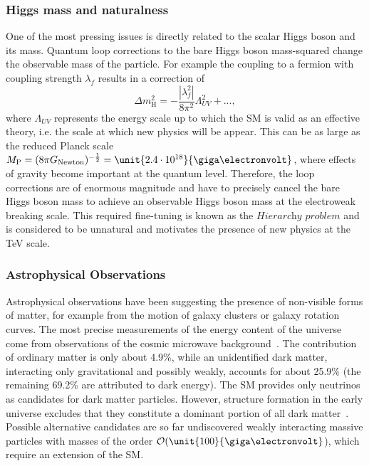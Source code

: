 \subsubsection*{Higgs mass and naturalness}
One of the most pressing issues is directly related to the scalar Higgs boson and its mass. Quantum loop corrections to the bare Higgs boson mass-squared change the observable mass of the particle. For example the coupling to a fermion with coupling strength $\lambda_f$ results in a correction of
\begin{equation}
\Delta m_{\mathrm{H}}^2 = -\frac{|\lambda_f^2|}{8\pi^2}\Lambda_{UV}^2 + ...,
\end{equation}
where $\Lambda_{UV}$ represents the energy scale up to which the SM is valid as an effective theory, i.e. the scale at which new physics will be appear. This can be as large as the reduced Planck scale $M_\mathrm{P} = (8\pi G_{\mathrm{Newton}})^{-\frac{1}{2}} = \unit{2.4\cdot 10^{18}}{\giga\electronvolt}$, where effects of gravity become important at the quantum level. Therefore, the loop corrections are of enormous magnitude and have to precisely cancel the bare Higgs boson mass to achieve an observable Higgs boson mass at the electroweak breaking scale. This required fine-tuning is known as the  $\textit{Hierarchy problem}$ and is considered to be unnatural and motivates the presence of new physics at the TeV scale.

\subsubsection*{Astrophysical Observations}
Astrophysical observations have been suggesting the presence of non-visible forms of matter, for example from the motion of galaxy clusters or galaxy rotation curves. The most precise measurements of the energy content of the universe come from observations of the cosmic microwave background~\cite{Adam:2015rua}. The contribution of ordinary matter is only about 4.9\%, while an unidentified dark matter, interacting only gravitational and possibly weakly, accounts for about 25.9\% (the remaining 69.2\% are attributed to dark energy). The SM provides only neutrinos as candidates for dark matter particles. However, structure formation in the early universe excludes that they constitute a dominant portion of all dark matter~\cite{PDG}. Possible alternative candidates are so far undiscovered weakly interacting massive particles with masses of the order $\mathcal{O}(\unit{100}{\giga\electronvolt}$), which require an extension of the SM. 

